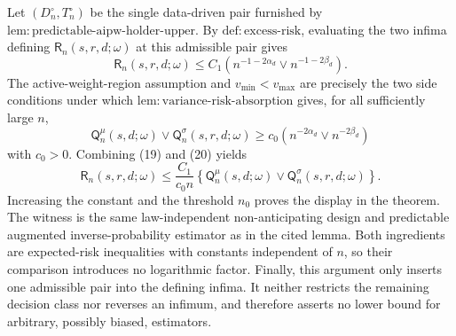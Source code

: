 Let \((D_n^{\circ},T_n^{\circ})\) be the single data-driven pair furnished by \(\mathrm{lem{:}predictable\text{-}aipw\text{-}holder\text{-}upper}\).  By \(\mathrm{def{:}excess\text{-}risk}\), evaluating the two infima defining \(\mathsf R_n(s,r,d;\omega)\) at this admissible pair gives
\[
\mathsf R_n(s,r,d;\omega)
\leq C_1\left(n^{-1-2\alpha_d}\vee n^{-1-2\beta_d}\right).
\tag{19}
\]
The active-weight-region assumption and \(v_{\min}<v_{\max}\) are precisely the two side conditions under which \(\mathrm{lem{:}variance\text{-}risk\text{-}absorption}\) gives, for all sufficiently large \(n\),
\[
\mathsf Q_n^{\mu}(s,d;\omega)\vee
\mathsf Q_n^{\sigma}(s,r,d;\omega)
\geq c_0\left(n^{-2\alpha_d}\vee n^{-2\beta_d}\right)
\tag{20}
\]
with \(c_0>0\).  Combining (19) and (20) yields
\[
\mathsf R_n(s,r,d;\omega)
\leq \frac{C_1}{c_0n}
\left\{\mathsf Q_n^{\mu}(s,d;\omega)\vee
\mathsf Q_n^{\sigma}(s,r,d;\omega)\right\}.
\]
Increasing the constant and the threshold \(n_0\) proves the display in the theorem.  The witness is the same law-independent non-anticipating design and predictable augmented inverse-probability estimator as in the cited lemma.  Both ingredients are expected-risk inequalities with constants independent of \(n\), so their comparison introduces no logarithmic factor.  Finally, this argument only inserts one admissible pair into the defining infima.  It neither restricts the remaining decision class nor reverses an infimum, and therefore asserts no lower bound for arbitrary, possibly biased, estimators.